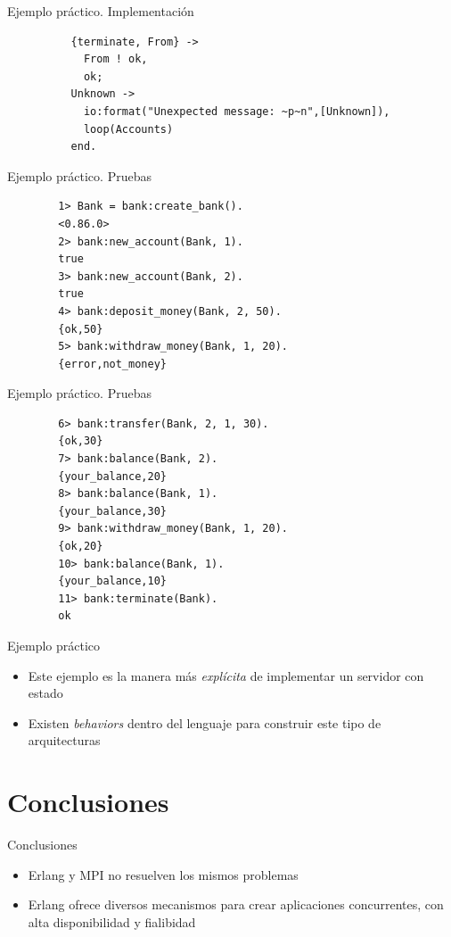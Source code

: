 \documentclass{beamer}
\begin{document}
    \begin{frame}[fragile]{Ejemplo práctico. Implementación}
      \begin{verbatim}
          {terminate, From} ->
            From ! ok,
            ok;
          Unknown ->
            io:format("Unexpected message: ~p~n",[Unknown]),
            loop(Accounts)
          end.
      \end{verbatim}
    \end{frame}

    \begin{frame}[fragile]{Ejemplo práctico. Pruebas}
      \begin{verbatim}
        1> Bank = bank:create_bank().
        <0.86.0>
        2> bank:new_account(Bank, 1).
        true
        3> bank:new_account(Bank, 2).
        true
        4> bank:deposit_money(Bank, 2, 50).
        {ok,50}
        5> bank:withdraw_money(Bank, 1, 20).
        {error,not_money}
      \end{verbatim}
    \end{frame}

    \begin{frame}[fragile]{Ejemplo práctico. Pruebas}
      \begin{verbatim}
        6> bank:transfer(Bank, 2, 1, 30).
        {ok,30}
        7> bank:balance(Bank, 2).
        {your_balance,20}
        8> bank:balance(Bank, 1).
        {your_balance,30}
        9> bank:withdraw_money(Bank, 1, 20).
        {ok,20}
        10> bank:balance(Bank, 1).
        {your_balance,10}
        11> bank:terminate(Bank).
        ok
      \end{verbatim}
    \end{frame}

    \begin{frame}{Ejemplo práctico}
      \begin{itemize}
        \item Este ejemplo es la manera más \textit{explícita} de implementar
        un servidor con estado
        \item Existen \textit{behaviors} dentro del lenguaje para construir
        este tipo de arquitecturas
      \end{itemize}
    \end{frame}

  \section{Conclusiones}
    \begin{frame}{Conclusiones}
      \begin{itemize}
        \item Erlang y MPI no resuelven los mismos problemas
        \item Erlang ofrece diversos mecanismos para crear aplicaciones
        concurrentes, con alta disponibilidad y fialibidad
      \end{itemize}
    \end{frame}
\end{document}
